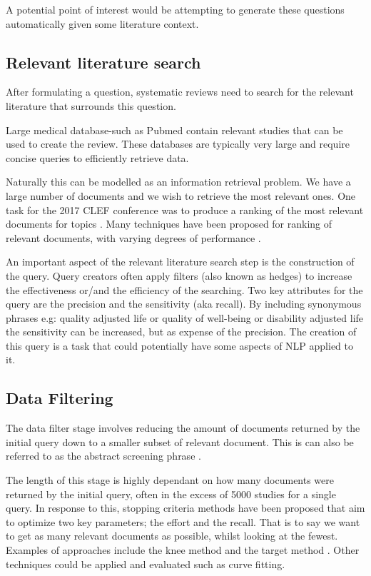 A potential point of interest would be attempting to generate these questions automatically given some literature context.

\subsection{Relevant literature search}

After formulating a question, systematic reviews need to search for the relevant literature that surrounds this question.

Large medical database-such as Pubmed \cite{pubmed} contain relevant studies that can be used to create the review. These databases are typically very large and require concise queries to efficiently retrieve data.

Naturally this can be modelled as an information retrieval problem. We have a large number of documents and we wish to retrieve the most relevant ones. One task for the 2017 CLEF conference was to produce a ranking of the most relevant documents for topics \cite{Kanoulas12017}. Many techniques have been proposed for ranking of relevant documents, with varying degrees of performance \cite{Alharbi2017} \cite{Gordon2017} \cite{Eunkyung2017}.

An important aspect of the relevant literature search step is the construction of the query. Query creators often apply filters (also known as hedges) to increase the effectiveness or/and the efficiency of the searching. Two key attributes for the query are the precision and the sensitivity (aka recall). By including synonymous phrases e.g: quality adjusted life or quality of well-being or disability adjusted life the sensitivity can be increased, but as expense of the precision. The creation of this query is a task that could potentially have some aspects of NLP applied to it.


\subsection{Data Filtering}

The data filter stage involves reducing the amount of documents returned by the initial query down to a smaller subset of relevant document. This is can also be referred to as the abstract screening phrase \cite{Kanoulas12017}.

The length of this stage is highly dependant on how many documents were returned by the initial query, often in the excess of 5000 studies for a single query. In response to this, stopping criteria methods have been proposed that aim to optimize two key parameters; the effort and the recall. That is to say we want to get as many relevant documents as possible, whilst looking at the fewest. Examples of approaches include the knee method \cite{Satopa11} and the target method \cite{Cormack2016}. Other techniques could be applied and evaluated such as curve fitting.

